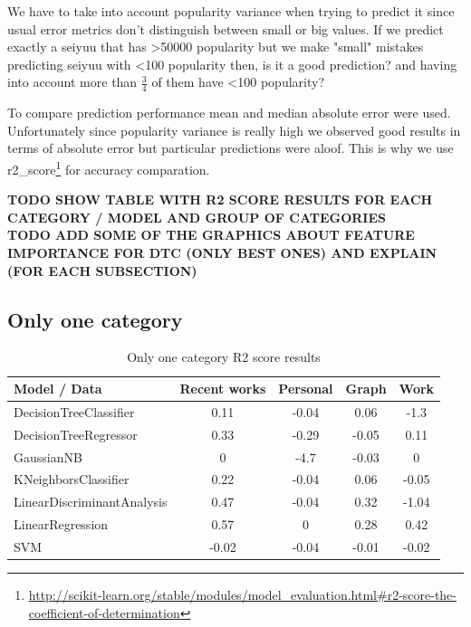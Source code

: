 We have to take into account popularity variance when trying to predict it since usual error metrics don't distinguish between small or big values. If we predict exactly a seiyuu that has \textgreater50000 popularity but we make "small" mistakes predicting seiyuu with \textless100 popularity then, is it a good prediction? and having into account more than $\frac{3}{4}$ of them have \textless100 popularity?

To compare prediction performance mean and median absolute error were used. Unfortunately since popularity variance is really high we observed good results in terms of absolute error but particular predictions were aloof. This is why we use r2\_score\footnote{\url{http://scikit-learn.org/stable/modules/model_evaluation.html#r2-score-the-coefficient-of-determination}} for accuracy comparation. 

\textbf{TODO SHOW TABLE WITH R2 SCORE RESULTS FOR EACH CATEGORY / MODEL AND GROUP OF CATEGORIES}\\
\textbf{TODO ADD SOME OF THE GRAPHICS ABOUT FEATURE IMPORTANCE FOR DTC (ONLY BEST ONES) AND EXPLAIN (FOR EACH SUBSECTION)}

\FloatBarrier
\subsection{Only one category}
\begin{table}[!hbt]
	\begin{center}
	\caption{Only one category R2 score results}
	\label{tab:oneCategory}
	\begin{tabular}{|l|c|c|c|c|}
		\hline
		Model / Data & Recent works & Personal & Graph & Work \\ 
		\hline
		DecisionTreeClassifier & 0.11 & -0.04 & 0.06 & -1.3 \\ 
		\hline
		DecisionTreeRegressor & 0.33 & -0.29 & -0.05 & 0.11 \\ 
		\hline
		GaussianNB & 0 & -4.7 & -0.03 & 0 \\ 
		\hline
		KNeighborsClassifier & 0.22 & -0.04 & 0.06 & -0.05 \\ 
		\hline
		LinearDiscriminantAnalysis & 0.47 & -0.04 & 0.32 & -1.04 \\ 
		\hline
		LinearRegression & 0.57 & 0 & 0.28 & 0.42 \\ 
		\hline
		SVM & -0.02 & -0.04 & -0.01 & -0.02 \\ 
		\hline
	\end{tabular}
	\end{center}
\end{table}

